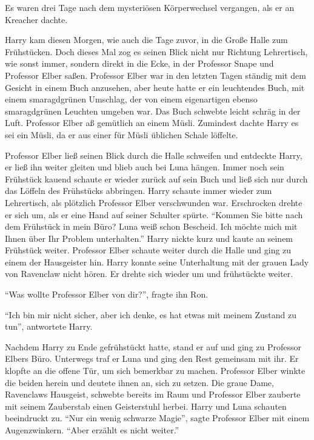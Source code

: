 Es waren drei Tage nach dem mysteriösen Körperwechsel vergangen, als er an Kreacher dachte. 

Harry kam diesen Morgen, wie auch die Tage zuvor, in die Große Halle zum Frühstücken. Doch dieses Mal zog es seinen Blick nicht nur Richtung Lehrertisch, wie sonst immer, sondern direkt in die Ecke, in der Professor Snape und Professor Elber saßen. Professor Elber war in den letzten Tagen ständig mit dem Gesicht in einem Buch anzusehen, aber heute hatte er ein leuchtendes Buch, mit einem smaragdgrünen Umschlag, der von einem eigenartigen ebenso smaragdgrünen Leuchten umgeben war. Das Buch schwebte leicht schräg in der Luft. Professor Elber aß gemütlich an einem Müsli. Zumindest dachte Harry es sei ein Müsli, da er aus einer für Müsli üblichen Schale löffelte.

Professor Elber ließ seinen Blick durch die Halle schweifen und entdeckte Harry, er ließ ihn weiter gleiten und blieb auch bei Luna hängen. Immer noch sein Frühstück kauend schaute er wieder zurück auf sein Buch und ließ sich nur durch das Löffeln des Frühstücks abbringen. Harry schaute immer wieder zum Lehrertisch, als plötzlich Professor Elber verschwunden war. Erschrocken drehte er sich um, als er eine Hand auf seiner Schulter spürte. \enquote{Kommen Sie bitte nach dem Frühstück in mein Büro? Luna weiß schon Bescheid. Ich möchte mich mit Ihnen über Ihr Problem unterhalten.} Harry nickte kurz und kaute an seinem Frühstück weiter. Professor Elber schaute weiter durch die Halle und ging zu einem der Hausgeister hin. Harry konnte seine Unterhaltung mit der grauen Lady von Ravenclaw nicht hören. Er drehte sich wieder um und frühstückte weiter.

\enquote{Was wollte Professor Elber von dir?}, fragte ihn Ron.

\enquote{Ich bin mir nicht sicher, aber ich denke, es hat etwas mit meinem Zustand zu tun}, antwortete Harry.

Nachdem Harry zu Ende gefrühstückt hatte, stand er auf und ging zu Professor Elbers Büro. Unterwegs traf er Luna und ging den Rest gemeinsam mit ihr. Er klopfte an die offene Tür, um sich bemerkbar zu machen. Professor Elber winkte die beiden herein und deutete ihnen an, sich zu setzen. Die graue Dame, Ravenclaws Hausgeist, schwebte bereits im Raum und Professor Elber zauberte mit seinem Zauberstab einen Geisterstuhl herbei. Harry und Luna schauten beeindruckt zu. \enquote{Nur ein wenig schwarze Magie}, sagte Professor Elber mit einem Augenzwinkern. \enquote{Aber erzählt es nicht weiter.}

